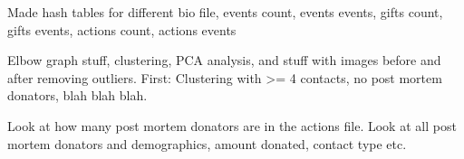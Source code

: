 \documentclass[../main.txt]{subfiles}
\begin{document}
Made hash tables for different bio file, events count, events events, gifts
count, gifts events, actions count, actions events

Elbow graph stuff, clustering, PCA analysis, and stuff with images before
and after removing outliers. First: Clustering with >= 4 contacts, no post
mortem donators, blah blah blah.

Look at how many post mortem donators are in the actions file. Look at all
post mortem donators and demographics, amount donated, contact type etc.













\biblo
\end{document}
